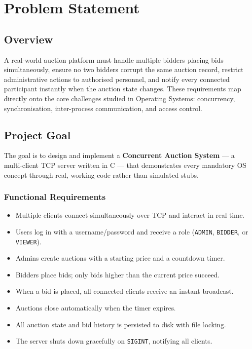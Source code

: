 \documentclass[12pt,a4paper]{report}
\begin{document}
\chapter{Problem Statement}

\section{Overview}

A real-world auction platform must handle multiple bidders placing bids simultaneously,
ensure no two bidders corrupt the same auction record, restrict administrative actions
to authorised personnel, and notify every connected participant instantly when the
auction state changes. These requirements map directly onto the core challenges studied
in Operating Systems: concurrency, synchronisation, inter-process communication, and
access control.

\section{Project Goal}

The goal is to design and implement a \textbf{Concurrent Auction System} — a
multi-client TCP server written in C — that demonstrates every mandatory OS concept
through real, working code rather than simulated stubs.

\subsection{Functional Requirements}

\begin{itemize}[noitemsep]
    \item Multiple clients connect simultaneously over TCP and interact in real time.
    \item Users log in with a username/password and receive a role (\texttt{ADMIN}, \texttt{BIDDER}, or \texttt{VIEWER}).
    \item Admins create auctions with a starting price and a countdown timer.
    \item Bidders place bids; only bids higher than the current price succeed.
    \item When a bid is placed, all connected clients receive an instant broadcast.
    \item Auctions close automatically when the timer expires.
    \item All auction state and bid history is persisted to disk with file locking.
    \item The server shuts down gracefully on \texttt{SIGINT}, notifying all clients.
\end{itemize}
\end{document}
